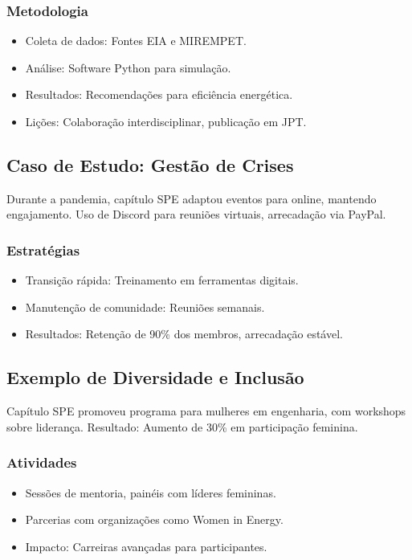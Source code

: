\documentclass[12pt]{article}
\begin{document}
\subsubsection{Metodologia}
\begin{itemize}
    \item Coleta de dados: Fontes EIA e MIREMPET.
    \item Análise: Software Python para simulação.
    \item Resultados: Recomendações para eficiência energética.
    \item Lições: Colaboração interdisciplinar, publicação em JPT.
\end{itemize}

\subsection{Caso de Estudo: Gestão de Crises}
Durante a pandemia, capítulo SPE adaptou eventos para online, mantendo engajamento. Uso de Discord para reuniões virtuais, arrecadação via PayPal.

\subsubsection{Estratégias}
\begin{itemize}
    \item Transição rápida: Treinamento em ferramentas digitais.
    \item Manutenção de comunidade: Reuniões semanais.
    \item Resultados: Retenção de 90\% dos membros, arrecadação estável.
\end{itemize}

\subsection{Exemplo de Diversidade e Inclusão}
Capítulo SPE promoveu programa para mulheres em engenharia, com workshops sobre liderança. Resultado: Aumento de 30\% em participação feminina.

\subsubsection{Atividades}
\begin{itemize}
    \item Sessões de mentoria, painéis com líderes femininas.
    \item Parcerias com organizações como Women in Energy.
    \item Impacto: Carreiras avançadas para participantes.
\end{itemize}
\end{document}
